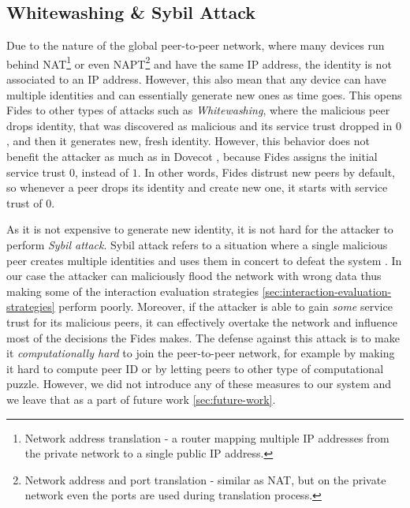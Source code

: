 \subsection{Whitewashing \& Sybil Attack}
Due to the nature of the global peer-to-peer network, where many devices run behind NAT\footnote{Network address translation - a router mapping multiple IP addresses from the private network to a single public IP address.} or even NAPT\footnote{Network address and port translation - similar as NAT, but on the private network even the ports are used during translation process.} and have the same IP address, the identity is not associated to an IP address.
However, this also mean that any device can have multiple identities and can essentially generate new ones as time goes.
This opens Fides to other types of attacks such as \textit{Whitewashing}, where the malicious peer drops identity, that was discovered as malicious and its service trust dropped in $0$, and then it generates new, fresh identity.
However, this behavior does not benefit the attacker as much as in Dovecot \cite{dita}, because Fides assigns the initial service trust $0$, instead of $1$.
In other words, Fides distrust new peers by default, so whenever a peer drops its identity and create new one, it starts with service trust of $0$.

As it is not expensive to generate new identity, it is not hard for the attacker to perform \textit{Sybil attack}.
Sybil attack refers to a situation where a single malicious peer creates multiple identities and uses them in concert to defeat the system \cite{sybil}.
In our case the attacker can maliciously flood the network with wrong data thus making some of the interaction evaluation strategies \ref{sec:interaction-evaluation-strategies} perform poorly.
Moreover, if the attacker is able to gain \textit{some} service trust for its malicious peers, it can effectively overtake the network and influence most of the decisions the Fides makes.
The defense against this attack is to make it \textit{computationally hard} to join the peer-to-peer network, for example by making it hard to compute peer ID or by letting peers to other type of computational puzzle. 
However, we did not introduce any of these measures to our system and we leave that as a part of future work \ref{sec:future-work}. 